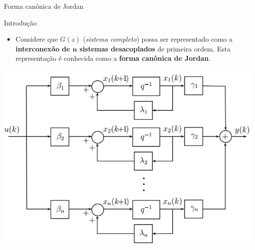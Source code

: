 \begin{frame}{Forma canônica de Jordan}
\begin{block}{Introdução}
\begin{itemize}
    \item Considere que $G(z)$ (\textit{sistema completo}) possa ser representado como a \textbf{interconexão de $\bm{n}$ sistemas desacoplados} de primeira ordem. Esta representação é conhecida como a \textbf{forma canônica de Jordan}.
\end{itemize}
\end{block}
\centerline{\includegraphics[width=0.65\linewidth]{Figuras/Ch14/fig8.PNG}}
\end{frame}


